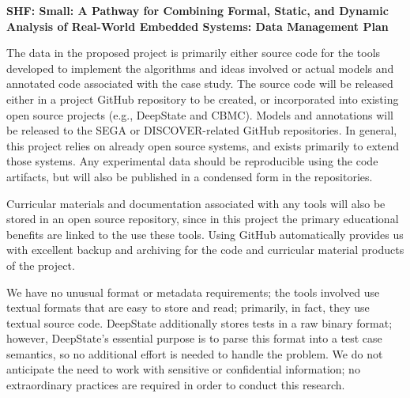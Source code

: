 \documentclass[12pt]{article}
\begin{document}

\begin{center}
  {\Large\sf\textbf{SHF: Small: A Pathway for Combining Formal, Static, and
  Dynamic Analysis of Real-World Embedded Systems: Data Management Plan}}
\end{center}

The data in the proposed project is primarily either source code for
the tools developed to implement the algorithms and ideas involved or
actual models and annotated code associated with the case study.  The source code will be released either in a project GitHub repository to be created, or incorporated into existing open source projects (e.g., DeepState and CBMC).  Models and annotations will be released to the SEGA or DISCOVER-related GitHub repositories.  In general, this project relies on already open source systems, and exists primarily to extend those systems.  Any experimental data should be reproducible using the code artifacts, but will also be published in a condensed form in the repositories.

Curricular
materials and documentation associated with any tools will also be stored in
an open source repository, since in this project the primary
educational benefits are linked to the use these tools.  Using GitHub automatically provides us with excellent backup
and archiving for the code and curricular material products of the
project.

We have no unusual format or metadata requirements; the
tools involved use textual formats that are easy to store and read;
primarily, in fact, they use textual source code.  DeepState additionally stores tests in a raw binary format; however, DeepState's essential purpose is to parse this format into a test case semantics, so no additional effort is needed to handle the problem.  
We do not anticipate the need to work with sensitive or confidential
information; no extraordinary practices are required in order to
conduct this research.
\end{document}
